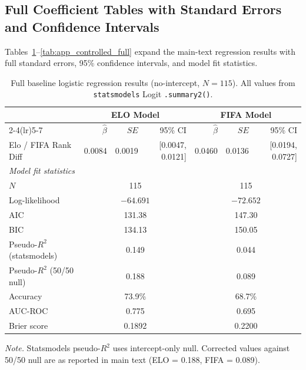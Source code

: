 \documentclass[12pt, a4paper]{article}
\begin{document}
\newpage
\begin{appendices}

\section{Full Coefficient Tables with Standard Errors and Confidence Intervals}
\label{app:coefficients}

Tables~\ref{tab:app_logistic_full}--\ref{tab:app_controlled_full} expand the main-text
regression results with full standard errors, 95\% confidence intervals, and model fit
statistics.

\begin{table}[H]
  \centering
  \caption{Full baseline logistic regression results (no-intercept, $N = 115$).
  All values from \texttt{statsmodels} Logit \texttt{.summary2()}.}
  \label{tab:app_logistic_full}
  \begin{tabular}{lrrrrrr}
    \toprule
    & \multicolumn{3}{c}{\textbf{ELO Model}} & \multicolumn{3}{c}{\textbf{FIFA Model}} \\
    \cmidrule(lr){2-4}\cmidrule(lr){5-7}
    & $\hat{\beta}$ & $SE$ & 95\% CI & $\hat{\beta}$ & $SE$ & 95\% CI \\
    \midrule
    Elo / FIFA Rank Diff & 0.0084 & 0.0019 & [0.0047, 0.0121] & 0.0460 & 0.0136 & [0.0194, 0.0727] \\
    \midrule
    \multicolumn{7}{l}{\textit{Model fit statistics}} \\
    \midrule
    $N$              & \multicolumn{3}{c}{115} & \multicolumn{3}{c}{115} \\
    Log-likelihood   & \multicolumn{3}{c}{$-64.691$} & \multicolumn{3}{c}{$-72.652$} \\
    AIC              & \multicolumn{3}{c}{131.38} & \multicolumn{3}{c}{147.30} \\
    BIC              & \multicolumn{3}{c}{134.13} & \multicolumn{3}{c}{150.05} \\
    Pseudo-$R^{2}$ (statsmodels) & \multicolumn{3}{c}{0.149} & \multicolumn{3}{c}{0.044} \\
    Pseudo-$R^{2}$ (50/50 null)  & \multicolumn{3}{c}{0.188} & \multicolumn{3}{c}{0.089} \\
    Accuracy         & \multicolumn{3}{c}{73.9\%} & \multicolumn{3}{c}{68.7\%} \\
    AUC-ROC          & \multicolumn{3}{c}{0.775}  & \multicolumn{3}{c}{0.695}  \\
    Brier score      & \multicolumn{3}{c}{0.1892} & \multicolumn{3}{c}{0.2200} \\
    \bottomrule
  \end{tabular}
  \parbox{\textwidth}{\smallskip\footnotesize \textit{Note.} Statsmodels pseudo-$R^{2}$
  uses intercept-only null. Corrected values against 50/50 null are as reported in main
  text (ELO = 0.188, FIFA = 0.089).}
\end{table}


\end{appendices}
\end{document}
